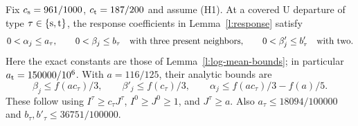 \begin{lemma}\label{l:response-typed}
Fix \(c_{\rm s}=961/1000\), \(c_{\rm t}=187/200\) and assume (H1).
At a covered \(\mathrm U\) departure of type \(\tau\in\{{\rm s},{\rm t}\}\),
the response coefficients in Lemma~\ref{l:response} satisfy
\[
 0<\alpha_j\le a_\tau,\qquad 0<\beta_j\le b_\tau
       \quad\hbox{with three present neighbors},\qquad
 0<\beta'_j\le b'_\tau\quad\hbox{with two}.
\]
Here the exact constants are those of Lemma~\ref{l:log-mean-bounds};
in particular \(a_{\rm t}=150000/10^6\).
With \(a=116/125\), their analytic bounds are
\[
 \beta_j\le f(ac_\tau)/3,\qquad
 \beta'_j\le f(c_\tau)/3,\qquad
 \alpha_j\le f(ac_\tau)/3-f(a)/5.
\]
These follow using \(I^\tau\ge c_\tau J^\tau\),
\(I^0\ge J^0\ge1\), and \(J^\tau\ge a\).
Also \(a_\tau\le18094/100000\) and
\(b_\tau,b'_\tau\le36751/100000\).
\end{lemma}

